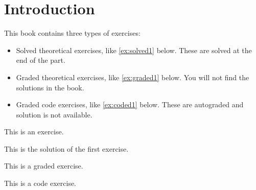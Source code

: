 

\section{Introduction}



This book contains three types of exercises:


\begin{itemize}

  \item Solved theoretical exercises, like \cref{ex:solved1} below. These are solved at the end of the part.
  \item Graded theoretical exercises, like \cref{ex:graded1} below. You will not find the solutions in the book.
  \item Graded code exercises, like \cref{ex:coded1} below. These are autograded and solution is not available.
\end{itemize}


\begin{exercise}
  \label{ex:solved1} This is an exercise.
\end{exercise}
\begin{solution}
  This is the solution of the first exercise.
\end{solution}

\begin{gradedexercise}
  \label{ex:graded1} This is a graded exercise.
\end{gradedexercise}

\begin{codeexercise}
  \label{ex:coded1}
  This is a code exercise.
\end{codeexercise}


